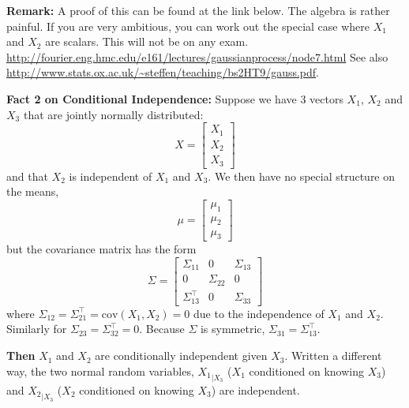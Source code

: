 \documentclass[letterpaper]{article}
\newcommand{\cov}{\mathrm{cov}}
\begin{document}
 \noindent \textbf{Remark:} A proof of this can be found at the link below. The algebra is rather painful. If you are very ambitious, you can work out the special case where $X_1$ and $X_2$ are scalars. This will not be on any exam.\\
 \url{http://fourier.eng.hmc.edu/e161/lectures/gaussianprocess/node7.html} See also\\
 \url{http://www.stats.ox.ac.uk/~steffen/teaching/bs2HT9/gauss.pdf}.

 \newpage

 \noindent \textbf{Fact 2 on Conditional Independence:} Suppose we have 3 vectors $X_1$, $X_2$ and $X_3$ that are jointly normally distributed:
$$X = \begin{bmatrix} X_1 \\ X_2 \\ X_3 \end{bmatrix} $$
and that $X_2$ is  independent of $X_1$ and $X_3$. We then have no special structure on the means,
$$ \mu = \begin{bmatrix} \mu_1 \\ \mu_2 \\\mu_3\end{bmatrix} $$
but the covariance matrix has the form
$$ \Sigma = \left[ \begin{array}{ccc} \Sigma_{11} & 0 & \Sigma_{13} \\ 0 & \Sigma_{22} & 0 \\ \Sigma_{13}^\top & 0 & \Sigma_{33} \end{array}  \right]$$
where $\Sigma_{12}=\Sigma_{21}^\top=\cov(X_1,X_2)=0$ due to the independence of $X_1$ and $X_2$. Similarly for $\Sigma_{23}=\Sigma_{32}^\top=0$. Because $\Sigma$ is symmetric, $\Sigma_{31}=\Sigma_{13}^\top$.

\vspace*{1cm}

 \textbf{Then} $X_1$ and $X_2$ are conditionally independent given $X_3$. Written a different way, the two normal random variables, ${X_1}_{|X_3}$ ($X_1$ conditioned on knowing $X_3$) and  ${X_2}_{|X_3}$ ($X_2$ conditioned on knowing $X_3$) are independent.

 \newpage
\end{document}
